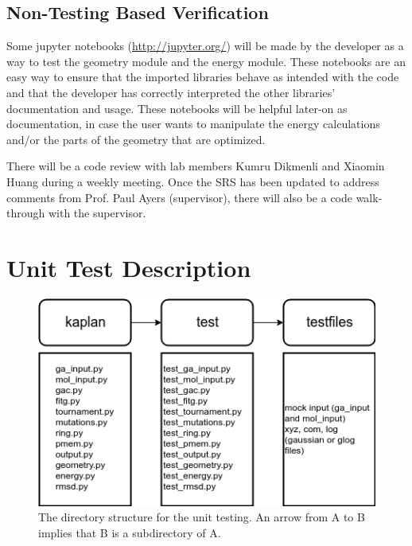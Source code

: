 \documentclass[12pt, titlepage]{article}
\begin{document}
\subsection{Non-Testing Based Verification}

Some jupyter notebooks (\url{http://jupyter.org/}) will be made by the 
developer as a way to test the geometry module and the energy module. These 
notebooks are an easy way to ensure that the imported libraries behave as 
intended with the \progname{} code and that the developer has correctly 
interpreted the other libraries' documentation and usage. These notebooks will 
be helpful later-on as documentation, in case the user wants to manipulate the 
energy calculations and/or the parts of the geometry that are optimized.

There will be a code review with lab members Kumru Dikmenli and Xiaomin Huang 
during a weekly meeting. Once the SRS has been updated to address comments from 
Prof. Paul Ayers (supervisor), there will also be a code walk-through with the 
supervisor.


\section{Unit Test Description}

\begin{figure}[H]
	\includegraphics[width=\textwidth]{directory-structure.png}
	\caption{The directory structure for the unit testing. An arrow from A to B 
		implies that B is a subdirectory of A.}
	\label{fig-dir-struct}
\end{figure}
\end{document}
